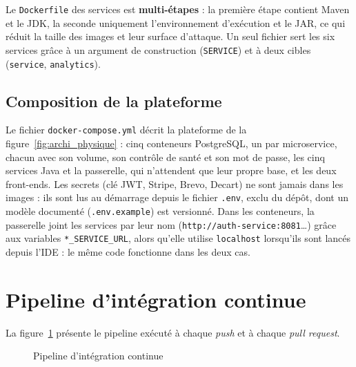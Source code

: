 Le \texttt{Dockerfile} des services est \textbf{multi-étapes} : la première étape contient Maven et le JDK, la seconde uniquement l'environnement d'exécution et le JAR, ce qui réduit la taille des images et leur surface d'attaque. Un seul fichier sert les six services grâce à un argument de construction (\texttt{SERVICE}) et à deux cibles (\texttt{service}, \texttt{analytics}).

\subsection{Composition de la plateforme}
Le fichier \texttt{docker-compose.yml} décrit la plateforme de la figure~\ref{fig:archi_physique} : cinq conteneurs PostgreSQL, un par microservice, chacun avec son volume, son contrôle de santé et son mot de passe, les cinq services Java et la passerelle, qui n'attendent que leur propre base, et les deux front-ends. Les secrets (clé JWT, Stripe, Brevo, Decart) ne sont jamais dans les images : ils sont lus au démarrage depuis le fichier \texttt{.env}, exclu du dépôt, dont un modèle documenté (\texttt{.env.example}) est versionné. Dans les conteneurs, la passerelle joint les services par leur nom (\texttt{http://auth-service:8081}\dots) grâce aux variables \texttt{*\_SERVICE\_URL}, alors qu'elle utilise \texttt{localhost} lorsqu'ils sont lancés depuis l'IDE : le même code fonctionne dans les deux cas.

\section{Pipeline d'intégration continue}
La figure~\ref{fig:pipeline} présente le pipeline exécuté à chaque \textit{push} et à chaque \textit{pull request}.
\begin{figure}[H]
    \centering
    \caption{Pipeline d'intégration continue}
    \label{fig:pipeline}
\end{figure}

